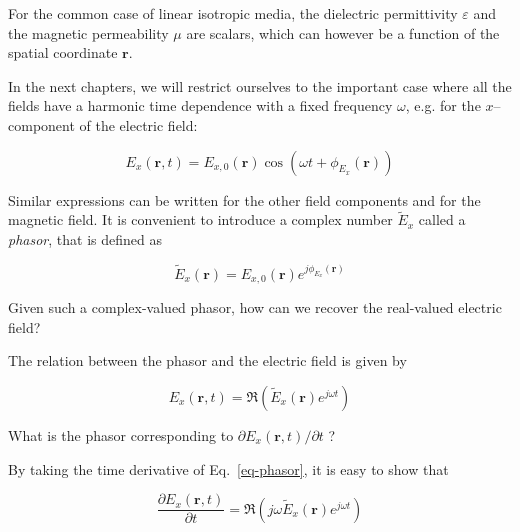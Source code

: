 For the common case of linear isotropic media, the dielectric permittivity $\varepsilon$ and the magnetic permeability $\mu$ are scalars, which can however be a function of the spatial coordinate ${\mathbf r}$.

In the next chapters, we will restrict ourselves to the important case where all the fields have a harmonic time dependence with a fixed frequency $\omega$, e.g. for the $x$--component of the electric field:

\begin{equation}
E_x({\mathbf r},t) = E_{x,0}({\mathbf r}) \cos \left( \omega t + \phi_{E_x} ({\mathbf r})
\right) \label{eq-phasor}
\end{equation}

Similar expressions can be written for the other field components and for the magnetic field. It is convenient to introduce a complex number $\tilde{E}_x$ called a \emph{phasor}, that is defined as

\begin{equation}
\tilde{E}_x(\mathbf{r})=E_{x,0}({\mathbf r}) e^{j \phi_{E_x}({\mathbf r})} \label{eq:phasor}
\end{equation}

\begin{cue}
Given such a complex-valued phasor, how can we recover the real-valued electric field?
\end{cue}

\pagebreak

\noindent{}The relation between the phasor and the electric field is given by

\begin{equation}
E_x({\mathbf r},t) = \Re \left(\tilde{E}_x({\mathbf r}) e^{j \omega t}\right)
\end{equation}

\begin{cue}
What is the phasor corresponding to $\partial E_x({\mathbf r},t) / \partial t$ ?
\end{cue}

By taking the time derivative of Eq.~\ref{eq-phasor}, it is easy to show that 

\begin{equation}
\frac{\partial E_x({\mathbf r},t)}{\partial t} = \Re \left(j \omega \tilde{E}_x({\mathbf r}) e^{j \omega t}\right)
\end{equation}

